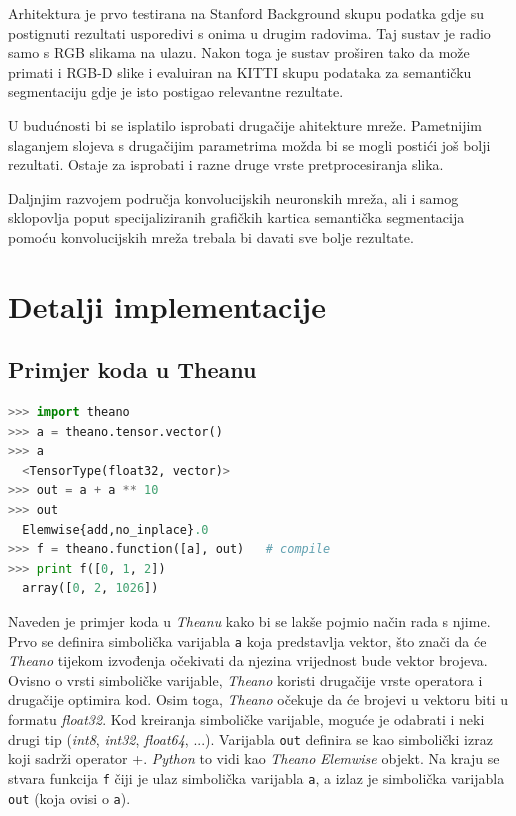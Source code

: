 \documentclass[times, utf8, diplomski, numeric]{fer}
\begin{document}
Arhitektura je prvo testirana na Stanford Background skupu podatka gdje su postignuti rezultati usporedivi s onima u drugim radovima. Taj sustav je radio samo s RGB slikama na ulazu. Nakon toga je sustav proširen tako da može primati i RGB-D slike i evaluiran na KITTI skupu podataka za semantičku segmentaciju gdje je isto postigao relevantne rezultate.

U budućnosti bi se isplatilo isprobati drugačije ahitekture mreže. Pametnijim slaganjem slojeva s drugačijim parametrima možda bi se mogli postići još bolji rezultati. Ostaje za isprobati i razne druge vrste pretprocesiranja slika.

Daljnjim razvojem područja konvolucijskih neuronskih mreža, ali i samog sklopovlja poput specijaliziranih grafičkih kartica semantička segmentacija pomoću konvolucijskih mreža trebala bi davati sve bolje rezultate.




\appendix

\chapter{Detalji implementacije}
\section{Primjer koda u Theanu}

\begin{lstlisting}[language=python]
>>> import theano
>>> a = theano.tensor.vector()
>>> a
  <TensorType(float32, vector)>
>>> out = a + a ** 10
>>> out
  Elemwise{add,no_inplace}.0
>>> f = theano.function([a], out)   # compile
>>> print f([0, 1, 2])
  array([0, 2, 1026])
\end{lstlisting}
Naveden je primjer koda u \textit{Theanu} kako bi se lakše pojmio način rada s njime. Prvo se definira simbolička varijabla \texttt{a} koja predstavlja vektor, što znači da će \textit{Theano} tijekom izvođenja očekivati da njezina vrijednost bude vektor brojeva. Ovisno o vrsti simboličke varijable, \textit{Theano} koristi drugačije vrste operatora i drugačije optimira kod. Osim toga, \textit{Theano} očekuje da će brojevi u vektoru biti u formatu \textit{float32}. Kod kreiranja simboličke varijable, moguće je odabrati i neki drugi tip (\textit{int8}, \textit{int32}, \textit{float64}, ...). Varijabla \texttt{out} definira se kao simbolički izraz koji sadrži operator +. \textit{Python} to vidi kao \textit{Theano} \textit{Elemwise} objekt. Na kraju se stvara funkcija \texttt{f} čiji je ulaz simbolička varijabla \texttt{a}, a izlaz je simbolička varijabla \texttt{out} (koja ovisi o \texttt{a}).
\end{document}
